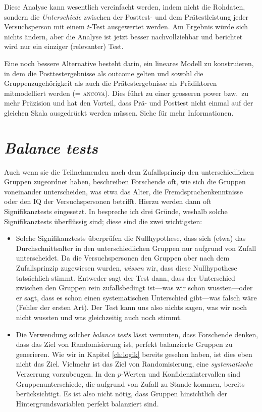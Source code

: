 \documentclass[oneside, 10pt]{book}\usepackage[]{graphicx}\usepackage[]{xcolor}
\begin{document}
Diese Analyse kann wesentlich vereinfacht werden, indem nicht
die Rohdaten, sondern die \emph{Unterschiede} zwischen der
Posttest- und dem Prätestleistung jeder Versuchsperson
mit einem $t$-Test ausgewertet werden. Am Ergebnis würde
sich nichts ändern, aber die Analyse ist jetzt besser
nachvollziehbar und berichtet wird nur ein einziger (relevanter) Test.

Eine noch bessere Alternative besteht darin, ein lineares
Modell zu konstruieren, in dem die Posttestergebnisse
als outcome gelten und sowohl die Gruppenzugehörigkeit
als auch die Prätestergebnisse als Prädiktoren mitmodelliert
werden (= \textsc{ancova}). Dies führt zu einer grosseren
power bzw.\ zu mehr Präzision und hat den Vorteil,
dass Prä- und Posttest nicht einmal auf der gleichen Skala
ausgedrückt werden müssen. Siehe \citet{Vanhove2015}
für mehr Informationen.

\section{\textit{Balance tests}}
Auch wenn sie die Teilnehmenden nach dem Zufallsprinzip
den unterschiedlichen Gruppen zugeordnet haben, beschreiben
Forschende oft, wie sich die Gruppen voneinander unterscheiden,
was etwa das Alter, die Fremdsprachenkenntnisse oder den IQ
der Versuchspersonen betrifft. Hierzu werden dann oft Signifikanztests
eingesetzt. In \citet{Vanhove2015} bespreche ich drei Gründe,
weshalb solche Signifikanztests überflüssig sind; diese
sind die zwei wichtigsten:
\begin{itemize}
 \item Solche Signifikanztests überprüfen die Nullhypothese,
 dass sich (etwa) das Durchschnittsalter in den unterschiedlichen
 Gruppen nur aufgrund von Zufall unterscheidet.
 Da die Versuchspersonen den Gruppen aber nach dem Zufallsprinzip
 zugewiesen wurden, \emph{wissen} wir, dass diese Nullhypothese
 tatsächlich stimmt. Entweder sagt der Test dann, dass der
 Unterschied zwischen den Gruppen rein zufallsbedingt ist---was 
 wir schon wussten---oder 
 er sagt, dass es schon einen systematischen Unterschied gibt---was falsch wäre
 (Fehler der ersten Art). Der Test kann uns also nichts sagen,
 was wir noch nicht wussten und was gleichzeitig auch noch stimmt.
 
 \item Die Verwendung solcher \textit{balance tests} lässt vermuten,
 dass Forschende denken, dass das Ziel von Randomisierung ist,
 perfekt balanzierte Gruppen zu generieren. Wie wir in Kapitel
 \ref{ch:logik} bereits gesehen haben, ist dies eben nicht das
 Ziel. Vielmehr ist das Ziel von Randomisierung, eine 
 \emph{systematische} Verzerrung vorzubeugen. In den $p$-Werten
 und Konfidenzintervallen sind Gruppenunterschiede, die aufgrund
 von Zufall zu Stande kommen, bereits berücksichtigt. Es ist also
 nicht nötig, dass Gruppen hinsichtlich der Hintergrundsvariablen
 perfekt balanziert sind.
 \end{itemize}
 
\end{document}
